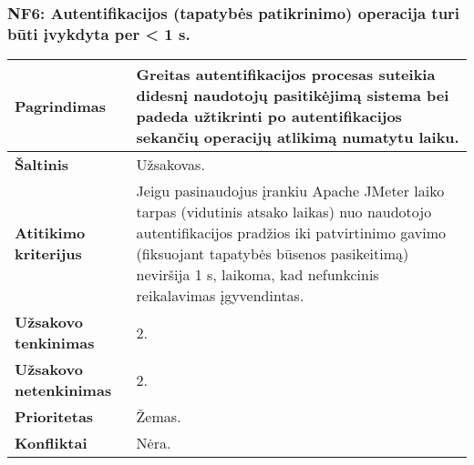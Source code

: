 \documentclass[12pt]{article}
\begin{document}
\subsubsection*{NF6: Autentifikacijos (tapatybės patikrinimo) operacija turi
būti įvykdyta per < 1 s.}
\label{sec:NF6}
\begin{table}[htb!]
    \captionsetup{justification=centering}
    \begin{tabular}{|m{4.9cm}|m{11cm}|}
        \hline
        \raggedleft \textbf{\cellcolor{orange!30}Pagrindimas} &
        Greitas autentifikacijos procesas suteikia didesnį naudotojų
        pasitikėjimą sistema bei padeda užtikrinti po autentifikacijos sekančių
        operacijų atlikimą numatytu laiku. \\
        \hline
        \raggedleft \textbf{\cellcolor{orange!30}Šaltinis} & Užsakovas. \\
        \hline
        \raggedleft \textbf{\cellcolor{orange!30}Atitikimo kriterijus} & 
        Jeigu pasinaudojus įrankiu Apache JMeter laiko tarpas (vidutinis atsako
        laikas) nuo naudotojo autentifikacijos pradžios iki patvirtinimo gavimo
        (fiksuojant tapatybės būsenos pasikeitimą) neviršija 1 s, laikoma, kad
        nefunkcinis reikalavimas įgyvendintas. \\
        \hline
        \raggedleft \textbf{\cellcolor{orange!30}Užsakovo tenkinimas} & 2. \\
        \hline
        \raggedleft \textbf{\cellcolor{orange!30}Užsakovo netenkinimas} & 2. \\
        \hline
        \raggedleft \textbf{\cellcolor{orange!30}Prioritetas} & Žemas. \\
        \hline
        \raggedleft \textbf{\cellcolor{orange!30}Konfliktai} & Nėra. \\
        \hline
    \end{tabular}
\end{table}
\end{document}
